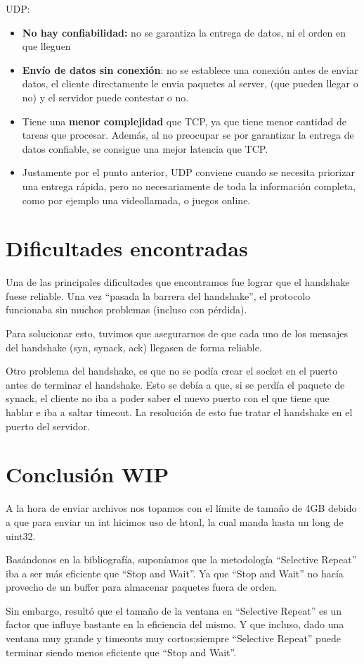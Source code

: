 \documentclass{article}
\begin{document}
UDP:

\begin{itemize}
\item
  \textbf{No hay confiabilidad:} no se garantiza la entrega de datos, ni
  el orden en que lleguen
\item
  \textbf{Envío de datos sin conexión}: no se establece una conexión
  antes de enviar datos, el cliente directamente le envia paquetes al
  server, (que pueden llegar o no) y el servidor puede contestar o no.
\item
  Tiene una \textbf{menor complejidad} que TCP, ya que tiene menor
  cantidad de tareas que procesar. Además, al no preocupar se por
  garantizar la entrega de datos confiable, se consigue una mejor
  latencia que TCP.
\item
  Justamente por el punto anterior, UDP conviene cuando se necesita
  priorizar una entrega rápida, pero no necesariamente de toda la
  información completa, como por ejemplo una videollamada, o juegos
  online.
\end{itemize}

\section{\texorpdfstring{\textbf{Dificultades
encontradas}}{Dificultades encontradas}}\label{dificultades-encontradas}

Una de las principales dificultades que encontramos fue lograr que el
handshake fuese reliable. Una vez ``pasada la barrera del handshake'',
el protocolo funcionaba sin muchos problemas (incluso con pérdida).

Para solucionar esto, tuvimos que asegurarnos de que cada uno de los
mensajes del handshake (syn, synack, ack) llegasen de forma reliable.

Otro problema del handshake, es que no se podía crear el socket en el
puerto antes de terminar el handshake. Esto se debía a que, si se perdía
el paquete de synack, el cliente no iba a poder saber el nuevo puerto
con el que tiene que hablar e iba a saltar timeout. La resolución de
esto fue tratar el handshake en el puerto del servidor.

\section{\texorpdfstring{\textbf{Conclusión
WIP}}{Conclusión}}\label{conclusiuxf3n-wip}

A la hora de enviar archivos nos topamos con el límite de tamaño de 4GB debido a que para enviar un int hicimos uso de htonl, la cual manda hasta un long de uint32.



Basándonos en la bibliografía, suponíamos que la metodología ``Selective Repeat'' iba a ser más eficiente que ``Stop and Wait''. Ya que ``Stop and Wait'' no hacía provecho de un buffer para almacenar paquetes fuera de orden.

Sin embargo, resultó que el tamaño de la ventana en ``Selective Repeat'' es un factor que influye bastante en la eficiencia del mismo. Y que incluso, dado una ventana muy grande y timeouts muy cortos;siempre ``Selective Repeat'' puede terminar siendo menos eficiente que ``Stop and Wait''.
\end{document}
